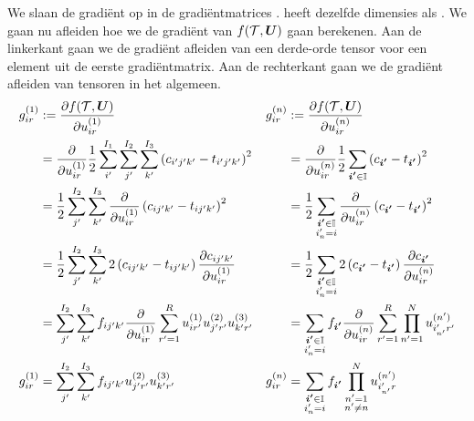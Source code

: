 We slaan de gradi\"ent op in de gradi\"entmatrices \GGG{}. \GGG{} heeft dezelfde dimensies als \UUU{}. We gaan nu afleiden hoe we de gradi\"ent van $f(\mathcal{T}, \boldsymbol{U})$ gaan berekenen. Aan de linkerkant gaan we de gradi\"ent afleiden van een derde-orde tensor voor een element uit de eerste gradi\"entmatrix. Aan de rechterkant gaan we de gradi\"ent afleiden van tensoren in het algemeen.
\begin{align*}
	g^{(1)}_{ir} 	&:= \frac{\partial f(\T, \mUUU)}{\partial u^{(1)}_{ir}} &
    g^{(n)}_{ir} 	&:= \frac{\partial f(\T, \mUUU)}{\partial u^{(n)}_{ir}}\\
%    
					&=\frac{\partial}{\partial u^{(1)}_{ir}} \frac{1}{2}\sum_{i'}^{I_1}\sum_{j'}^{I_2}\sum_{k'}^{I_3}\left(c_{i'j'k'} - t_{i'j'k'} \right)^2 &
					&=\frac{\partial}{\partial u^{(n)}_{ir}} \frac{1}{2}\sum_{\iii{} \in \I}\left(c_{\iii{}} - t_{\iii{}} \right)^2\\
%					
					&= \frac{1}{2} \sum_{j'}^{I_2}\sum_{k'}^{I_3} \frac{\partial}{\partial u^{(1)}_{ir}} \left(c_{ij'k'} - t_{ij'k'} \right)^2 &
					&= \frac{1}{2} \sum_{\substack{\iii{} \in \I\\ i'_n = i}} \frac{\partial}{\partial u^{(n)}_{ir}} \left(c_{\iii{}} - t_{\iii{}} \right)^2\\
%					
					&= \frac{1}{2} \sum_{j'}^{I_2}\sum_{k'}^{I_3} 2 \left(c_{ij'k'} - t_{ij'k'} \right) \frac{\partial c_{ij'k'}}{\partial u^{(1)}_{ir}} &
					&= \frac{1}{2} \sum_{\substack{\iii{} \in \I\\ i'_n = i}} 2 \left(c_{\iii{}} - t_{\iii{}} \right) \frac{\partial c_{\iii{}}}{\partial u^{(n)}_{ir}}\\
%					
					&=\sum_{j'}^{I_2}\sum_{k'}^{I_3} f_{ij'k'} \frac{\partial}{\partial u^{(1)}_{ir}} \sum_{r'=1}^{R}  u^{(1)}_{ir'} u^{(2)}_{j'r'} u^{(3)}_{k'r'}&
					&=\sum_{\substack{\iii{} \in \I\\ i'_n = i}} f_{\iii{}} \frac{\partial}{\partial u^{(n)}_{ir}} \sum_{r'=1}^{R} \prod_{n'=1}^{N} u^{(n')}_{i'_{n'}r'}\\
%					
	g^{(1)}_{ir}	&=\sum_{j'}^{I_2}\sum_{k'}^{I_3} f_{ij'k'} u^{(2)}_{j'r'} u^{(3)}_{k'r'}&
	g^{(n)}_{ir}	&=\sum_{\substack{\iii{} \in \I\\ i'_n = i}} f_{\iii{}} \prod_{\substack{n'=1\\n'\neq n}}^{N} u^{(n')}_{i'_{n'}r}
\end{align*}